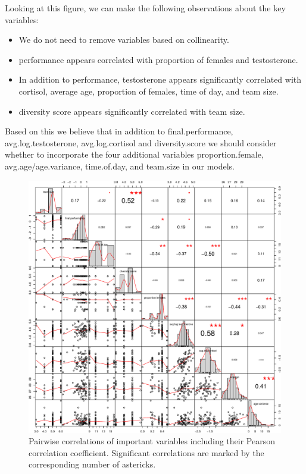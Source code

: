 \documentclass[]{article}
\providecommand{\tightlist}{%
  \setlength{\itemsep}{0pt}\setlength{\parskip}{0pt}}
\begin{document}
Looking at this figure, we can make the following observations about the
key variables:

\begin{itemize}
\tightlist
\item
  We do not need to remove variables based on collinearity.
\item
  performance appears correlated with proportion of females and
  testosterone.
\item
  In addition to performance, testosterone appears significantly
  correlated with cortisol, average age, proportion of females, time of
  day, and team size.
\item
  diversity score appears significantly correlated with team size.
\end{itemize}

Based on this we believe that in addition to final.performance,
avg.log.testosterone, avg.log.cortisol and diversity.score we should
consider whether to incorporate the four additional variables
proportion.female, avg.age/age.variance, time.of.day, and team.size in
our models.

\begin{figure}
\centering
\includegraphics{19_10_02_hw5_q1_files/figure-latex/dists-1.pdf}
\caption{\label{fig:pairs}Pairwise correlations of important variables
including their Pearson correlation coefficient. Significant
correlations are marked by the corresponding number of astericks.}
\end{figure}
\end{document}
